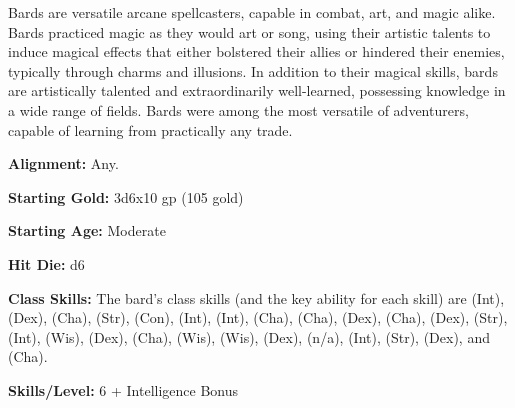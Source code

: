 
Bards are versatile arcane spellcasters, capable in combat, art, and magic alike. Bards practiced magic as they would art or song, using their artistic talents to induce magical effects that either bolstered their allies or hindered their enemies, typically through charms and illusions. In addition to their magical skills, bards are artistically talented and extraordinarily well-learned, possessing knowledge in a wide range of fields. Bards were among the most versatile of adventurers, capable of learning from practically any trade.

\textbf{Alignment:} Any.

\textbf{Starting Gold:} 3d6x10 gp (105 gold)

\textbf{Starting Age:} Moderate

\textbf{Hit Die:} d6

\textbf{Class Skills:} The bard's class skills (and the key ability for each skill) are  (Int),  (Dex),  (Cha),  (Str),  (Con),  (Int),  (Int),  (Cha),  (Cha),  (Dex),  (Cha),  (Dex),  (Str),  (Int),  (Wis),  (Dex),  (Cha),  (Wis),  (Wis),  (Dex),  (n/a),  (Int),  (Str),  (Dex), and  (Cha).

\textbf{Skills/Level:} 6 + Intelligence Bonus

\modebab{}
\poorfor{}
\goodref{}
\goodwil{}

